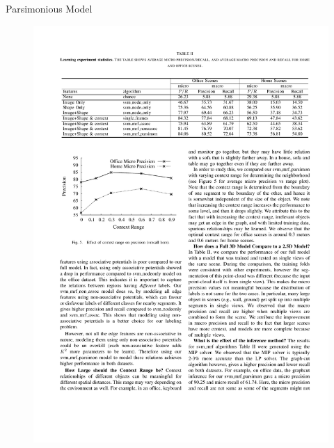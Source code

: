 \documentclass{beamer}
\begin{document}
\begin{frame}{Parsimonious Model}
\begin{figure}
\includegraphics[width=\linewidth]{table3_2.pdf}
\end{figure}

\end{frame}
\end{document}
